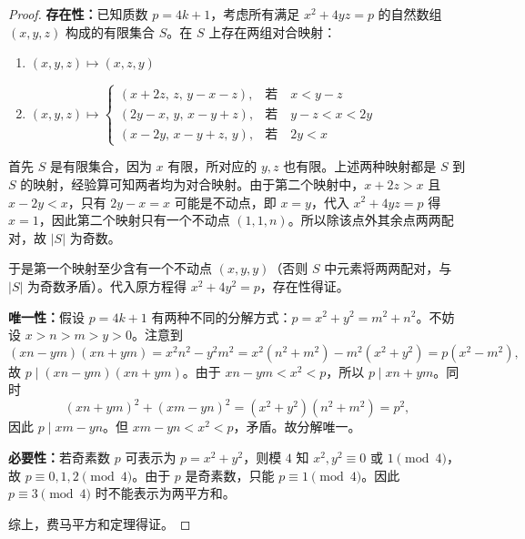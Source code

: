 \begin{proof}\leavevmode

\textbf{存在性：}已知质数 $p = 4k + 1$，考虑所有满足 $x^2 + 4yz = p$ 的自然数组 $(x, y, z)$ 构成的有限集合 $S$。在 $S$ 上存在两组对合映射：

\begin{enumerate}
\item $(x, y, z) \mapsto (x, z, y)$
\item $(x, y, z) \mapsto 
\begin{cases}(x + 2z,\, z,\, y - x - z), & \text{若} \quad x < y - z \\[4pt]
(2y - x,\, y,\, x - y + z), & \text{若} \quad y - z < x < 2y \\[4pt]
(x - 2y,\, x - y + z,\, y), & \text{若} \quad 2y < x\end{cases}$
\end{enumerate}

首先 $S$ 是有限集合，因为 $x$ 有限，所对应的 $y, z$ 也有限。上述两种映射都是 $S$ 到 $S$ 的映射，经验算可知两者均为对合映射。由于第二个映射中，$x + 2z > x$ 且 $x - 2y < x$，只有 $2y - x = x$ 可能是不动点，即 $x = y$，代入 $x^2 + 4yz = p$ 得 $x = 1$，因此第二个映射只有一个不动点 $(1, 1, n)$。所以除该点外其余点两两配对，故 $|S|$ 为奇数。

于是第一个映射至少含有一个不动点 $(x, y, y)$（否则 $S$ 中元素将两两配对，与 $|S|$ 为奇数矛盾）。代入原方程得 $x^2 + 4y^2 = p$，存在性得证。

\textbf{唯一性：}假设 $p = 4k + 1$ 有两种不同的分解方式：$p = x^2 + y^2 = m^2 + n^2$。不妨设 $x > n > m > y > 0$。注意到
\[
(xn - ym)(xn + ym) = x^2n^2 - y^2m^2 = x^2(n^2 + m^2) - m^2(x^2 + y^2) = p(x^2 - m^2),
\]
故 $p \mid (xn - ym)(xn + ym)$。由于 $xn - ym < x^2 < p$，所以 $p \mid xn + ym$。同时
\[
(xn + ym)^2 + (xm - yn)^2 = (x^2 + y^2)(n^2 + m^2) = p^2,
\]
因此 $p \mid xm - yn$。但 $xm - yn < x^2 < p$，矛盾。故分解唯一。

\textbf{必要性：}若奇素数 $p$ 可表示为 $p = x^2 + y^2$，则模 $4$ 知 $x^2, y^2 \equiv 0$ 或 $1 \pmod 4$，故 $p \equiv 0,1,2 \pmod 4$。由于 $p$ 是奇素数，只能 $p \equiv 1 \pmod 4$。因此 $p \equiv 3 \pmod 4$ 时不能表示为两平方和。

综上，费马平方和定理得证。

\end{proof}